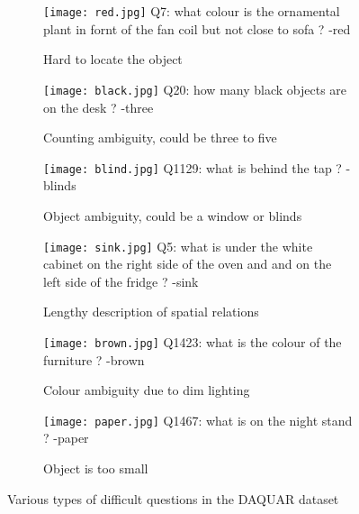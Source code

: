 \begin{figure}
    \centering
    \footnotesize
    \begin{subfigure}[t]{0.3\textwidth}
            \texttt{[image: red.jpg]}
            Q7: what colour is the ornamental plant in fornt of the fan coil but not close to sofa ? -red
            \caption{Hard to locate the object}
    \end{subfigure}%
    \quad
    \begin{subfigure}[t]{0.3\textwidth}
            \texttt{[image: black.jpg]}
            Q20: how many black objects are on the desk ? -three
            \caption{Counting ambiguity, could be three to five}
    \end{subfigure}
    \quad
    \begin{subfigure}[t]{0.3\textwidth}
            \texttt{[image: blind.jpg]}
            Q1129: what is behind the tap ? -blinds
            \caption{Object ambiguity, could be a window or blinds}
    \end{subfigure}
    \quad
    \begin{subfigure}[t]{0.3\textwidth}
            \texttt{[image: sink.jpg]}
            Q5: what is under the white cabinet on the right side of the oven and and on the left side of the fridge ? -sink
            \caption{Lengthy description of spatial relations}
    \end{subfigure}
    \quad
    \begin{subfigure}[t]{0.3\textwidth}
            \texttt{[image: brown.jpg]}
            Q1423: what is the colour of the furniture ? -brown
            \caption{Colour ambiguity due to dim lighting}
    \end{subfigure}
    \quad
    \begin{subfigure}[t]{0.3\textwidth}
            \texttt{[image: paper.jpg]}
            Q1467: what is on the night stand ? -paper
            \caption{Object is too small}
    \end{subfigure}
    \caption{Various types of difficult questions in the DAQUAR dataset}
	\label{fig:difficult}
\end{figure}

